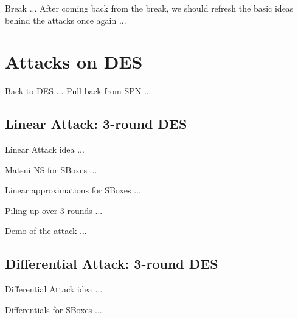 \documentclass[9pt]{beamer}
\begin{document}
\begin{frame}
Break ... After coming back from the break, we should refresh the basic ideas behind the attacks once again ...

\end{frame}


\section{Attacks on DES}
\begin{frame}
Back to DES ... Pull back from SPN ...

\end{frame}

\subsection{Linear Attack: 3-round DES}
\begin{frame}
Linear Attack idea ... 

\end{frame}

\begin{frame}
Matsui NS for SBoxes ...

\end{frame}

\begin{frame}
Linear approximations for SBoxes ...

\end{frame}

\begin{frame}
Piling up over 3 rounds ...

\end{frame}

\begin{frame}
Demo of the attack ...

\end{frame}

\subsection{Differential Attack: 3-round DES}
\begin{frame}
Differential Attack idea ... 

\end{frame}

\begin{frame}
Differentials for SBoxes ...

\end{frame}
\end{document}
